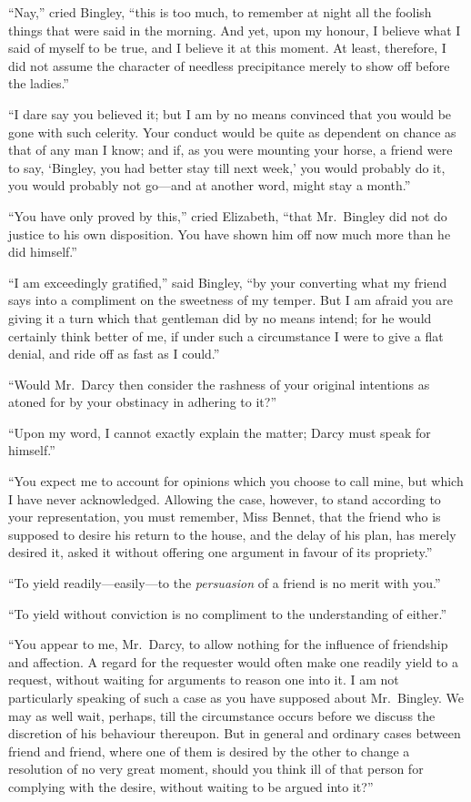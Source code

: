 \documentclass[12pt,english,oneside]{book}
\begin{document}
{}``Nay,'' cried Bingley, {}``this is too much, to remember at
night all the foolish things that were said in the morning. And yet,
upon my honour, I believe what I said of myself to be true, and I
believe it at this moment. At least, therefore, I did not assume the
character of needless precipitance merely to show off before the ladies.''

{}``I dare say you believed it; but I am by no means convinced that
you would be gone with such celerity. Your conduct would be quite
as dependent on chance as that of any man I know; and if, as you were
mounting your horse, a friend were to say, `Bingley, you had better
stay till next week,' you would probably do it, you would probably
not go\mbox{---}and at another word, might stay a month.''

{}``You have only proved by this,'' cried Elizabeth, {}``that Mr.\ 
Bingley did not do justice to his own disposition. You have shown
him off now much more than he did himself.''

{}``I am exceedingly gratified,'' said Bingley, {}``by your converting
what my friend says into a compliment on the sweetness of my temper.
But I am afraid you are giving it a turn which that gentleman did
by no means intend; for he would certainly think better of me, if
under such a circumstance I were to give a flat denial, and ride off
as fast as I could.''

{}``Would Mr.\ Darcy then consider the rashness of your original
intentions as atoned for by your obstinacy in adhering to it?''\ 

{}``Upon my word, I cannot exactly explain the matter; Darcy must
speak for himself.''

{}``You expect me to account for opinions which you choose to call
mine, but which I have never acknowledged. Allowing the case, however,
to stand according to your representation, you must remember, Miss
Bennet, that the friend who is supposed to desire his return to the
house, and the delay of his plan, has merely desired it, asked it
without offering one argument in favour of its propriety.''

{}``To yield readily\mbox{---}easily\mbox{---}to the \textit{persuasion}
of a friend is no merit with you.''

{}``To yield without conviction is no compliment to the understanding
of either.''

{}``You appear to me, Mr.\ Darcy, to allow nothing for the influence
of friendship and affection. A regard for the requester would often
make one readily yield to a request, without waiting for arguments
to reason one into it. I am not particularly speaking of such a case
as you have supposed about Mr.\ Bingley. We may as well wait, perhaps,
till the circumstance occurs before we discuss the discretion of his
behaviour thereupon. But in general and ordinary cases between friend
and friend, where one of them is desired by the other to change a
resolution of no very great moment, should you think ill of that person
for complying with the desire, without waiting to be argued into it?''\ 
\end{document}
